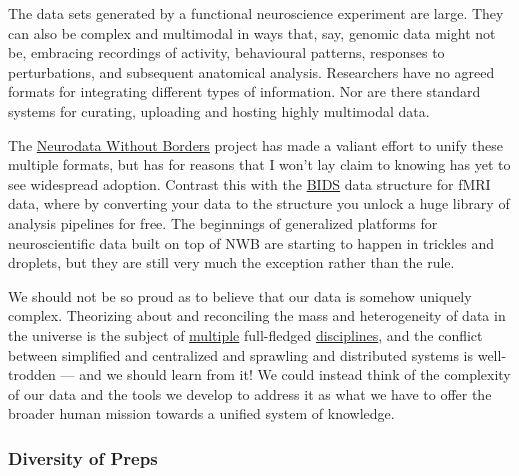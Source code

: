 \documentclass[11pt]{article}
\begin{document}
\begin{multicols}{2}
\begin{leftbar}
The data sets generated by a functional neuroscience experiment are
large. They can also be complex and multimodal in ways that, say,
genomic data might not be, embracing recordings of activity, behavioural
patterns, responses to perturbations, and subsequent anatomical
analysis. Researchers have no agreed formats for integrating different
types of information. Nor are there standard systems for curating,
uploading and hosting highly multimodal data. \cite{mainenBetterWayCrack2016} 
\end{leftbar}

The \href{https://www.nwb.org/}{Neurodata Without Borders} project has
made a valiant effort to unify these multiple formats, but has for
reasons that I won't lay claim to knowing has yet to see widespread
adoption. Contrast this with the
\href{https://bids.neuroimaging.io/}{BIDS} data structure for fMRI data,
where by converting your data to the structure you unlock a huge library
of analysis pipelines for free. The beginnings of generalized platforms
for neuroscientific data built on top of NWB are starting to happen in
trickles and droplets, but they are still very much the exception rather
than the rule.

We should not be so proud as to believe that our data is somehow
uniquely complex. Theorizing about and reconciling the mass and
heterogeneity of data in the universe is the subject of
\href{https://en.wikipedia.org/wiki/Information_science}{multiple}
full-fledged
\href{https://en.wikipedia.org/wiki/Library_science}{disciplines}, and
the conflict between simplified and centralized \cite{bakerMaintainingDublinCore2005}  and sprawling and distributed \cite{berners-leeSEMANTICWEB2001}  systems is well-trodden --- and we
should learn from it! We could instead think of the complexity of our
data and the tools we develop to address it as what we have to offer the
broader human mission towards a unified system of knowledge.

\hypertarget{diversity-of-preps}{%
\subsubsection{Diversity of Preps}\label{diversity-of-preps}}


\end{multicols}
\end{document}
